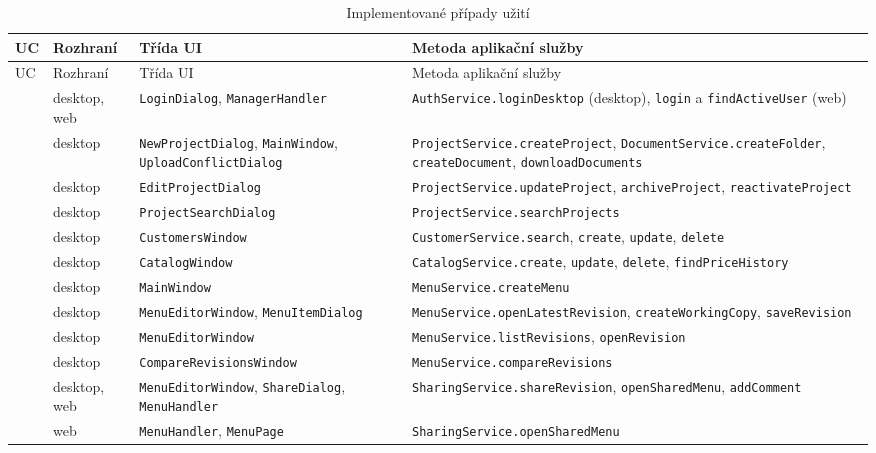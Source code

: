 {\small
\begin{xltabular}{\textwidth}{@{}p{1.1cm}p{1.9cm}>{\raggedright\arraybackslash}p{4.6cm}>{\raggedright\arraybackslash}X@{}}
\caption{Implementované případy užití}\label{tab:impl:uc}\\
\toprule
UC & Rozhraní & Třída UI & Metoda aplikační služby \\
\midrule
\endfirsthead
\toprule
UC & Rozhraní & Třída UI & Metoda aplikační služby \\
\midrule
\endhead
{} & desktop, web & \texttt{LoginDialog}, \texttt{ManagerHandler} & \texttt{AuthService.loginDesktop} (desktop), \texttt{login} a \texttt{findActiveUser} (web) \\
\textbf{} & desktop & \texttt{NewProjectDialog}, \texttt{MainWindow}, \texttt{UploadConflictDialog} & \texttt{ProjectService.createProject}, \texttt{DocumentService.createFolder}, \texttt{createDocument}, \texttt{downloadDocuments} \\
 & desktop & \texttt{EditProjectDialog} & \texttt{ProjectService.updateProject}, \texttt{archiveProject}, \texttt{reactivateProject} \\
 & desktop & \texttt{ProjectSearchDialog} & \texttt{ProjectService.searchProjects} \\
 & desktop & \texttt{CustomersWindow} & \texttt{CustomerService.search}, \texttt{create}, \texttt{update}, \texttt{delete} \\
 & desktop & \texttt{CatalogWindow} & \texttt{CatalogService.create}, \texttt{update}, \texttt{delete}, \texttt{findPriceHistory} \\
 & desktop & \texttt{MainWindow} & \texttt{MenuService.createMenu} \\
\textbf{} & desktop & \texttt{MenuEditorWindow}, \texttt{MenuItemDialog} & \texttt{MenuService.openLatestRevision}, \texttt{createWorkingCopy}, \texttt{saveRevision} \\
 & desktop & \texttt{MenuEditorWindow} & \texttt{MenuService.listRevisions}, \texttt{openRevision} \\
 & desktop & \texttt{CompareRevisionsWindow} & \texttt{MenuService.compareRevisions} \\
\textbf{} & desktop, web & \texttt{MenuEditorWindow}, \texttt{ShareDialog}, \texttt{MenuHandler} & \texttt{SharingService.shareRevision}, \texttt{openSharedMenu}, \texttt{addComment} \\
 & web & \texttt{MenuHandler}, \texttt{MenuPage} & \texttt{SharingService.openSharedMenu} \\

\end{xltabular}}
